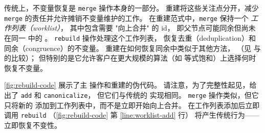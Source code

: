 传统上，不变量恢复是 \texttt{merge} 操作本身的一部分。
重建将这些关注点分开，减少 \texttt{merge} 的责任并允许摊销不变量维护的工作。
在重建范式中，\texttt{merge} 保持一个 \textit{工作列表（worklist）}，
  其中包含需要 "向上合并" 的 \eclass id，
  即父节点可能同余但尚未在同一 \eclass 中的 \eclasses。
\texttt{rebuild} 操作处理这个工作列表，
  恢复去重（deduplication）和同余（congruence）的不变量。
重建在如何恢复同余中类似于其他方法，
  （见  与 \citet{downey-cse} 的比较）；
  但特别的是它允许客户在更大规模的算法（如 等式饱和）上选择何时恢复不变量。

\autoref{fig:rebuild-code} 展示了主 \egraph 操作和重建的伪代码。
请注意，为了完整性起见，给出了 \texttt{add} 和 \texttt{canonicalize}，
  但它们与传统的 \egraph 实现相同。
\texttt{merge} 操作类似，但它只将新的 \eclass 添加到工作列表中，而不是立即开始向上合并。
在工作列表添加后立即调用 \texttt{rebuild} 
  （\autoref{fig:rebuild-code} 第 \ref{line:worklist-add} 行）
  将产生传统行为——立即恢复不变性。


